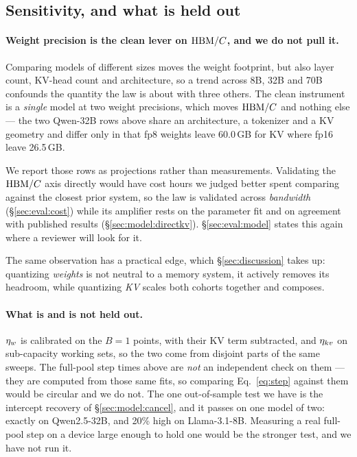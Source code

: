 \subsection*{Sensitivity, and what is held out}

\paragraph{Weight precision is the clean lever on $\mathrm{HBM}/C$, and we do not
pull it.} Comparing models of different sizes moves the weight footprint, but
also layer count, KV-head count and architecture, so a trend across 8B, 32B and
70B confounds the quantity the law is about with three others. The clean
instrument is a \emph{single} model at two weight precisions, which moves
$\mathrm{HBM}/C$ and nothing else --- the two Qwen-32B rows above share an
architecture, a tokenizer and a KV geometry and differ only in that fp8 weights
leave 60.0\,GB for KV where fp16 leave 26.5\,GB.

We report those rows as projections rather than measurements. Validating the
$\mathrm{HBM}/C$ axis directly would have cost hours we judged better spent
comparing against the closest prior system, so the law is validated across
\emph{bandwidth} (\S\ref{sec:eval:cost}) while its amplifier rests on the
parameter fit and on agreement with published results
(\S\ref{sec:model:directkv}). \S\ref{sec:eval:model} states this again where
a reviewer will look for it.

The same observation has a practical edge, which \S\ref{sec:discussion} takes
up: quantizing \emph{weights} is not neutral to a memory system, it actively
removes its headroom, while quantizing \emph{KV} scales both cohorts together
and composes.

\paragraph{What is and is not held out.} $\eta_w$ is calibrated on the $B{=}1$
points, with their KV term subtracted, and $\eta_{kv}$ on sub-capacity working
sets, so the two come from disjoint parts of the same sweeps. The full-pool step
times above are \emph{not} an independent check on them --- they are computed
from those same fits, so comparing Eq.~\ref{eq:step} against them would be
circular and we do not. The one out-of-sample test we have is the intercept
recovery of \S\ref{sec:model:cancel}, and it passes on one model of two:
exactly on Qwen2.5-32B, and 20\% high on Llama-3.1-8B. Measuring a real
full-pool step on a device large enough to hold one would be the stronger test,
and we have not run it.

